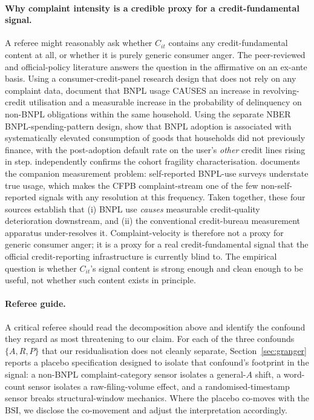 \documentclass[11pt,letterpaper]{article}
\newcommand{\bsi}{\text{BSI}}
\begin{document}
\paragraph{Why complaint intensity is a credible proxy for a
credit-fundamental signal.} A referee might reasonably ask
whether $C_{it}$ contains any credit-fundamental content at
all, or whether it is purely generic consumer anger. The
peer-reviewed and official-policy literature answers the
question in the affirmative on an ex-ante basis. Using a
consumer-credit-panel research design that does not rely on any
complaint data, \citet{fedphilly2023bnpl} document that BNPL
usage CAUSES an increase in revolving-credit utilisation and
a measurable increase in the probability of delinquency on
non-BNPL obligations within the same household. Using the
separate NBER BNPL-spending-pattern design,
\citet{dimaggio2022buy} show that BNPL adoption is associated
with systematically elevated consumption of goods that
households did not previously finance, with the post-adoption
default rate on the user's \emph{other} credit lines rising in
step. \citet{fedboston2024bnpl} independently confirms the
cohort fragility characterisation. \citet{dehaan2024accuracy}
documents the companion measurement problem: self-reported
BNPL-use surveys understate true usage, which makes the CFPB
complaint-stream one of the few non-self-reported signals with
any resolution at this frequency. Taken together, these four
sources establish that (i) BNPL use \emph{causes} measurable
credit-quality deterioration downstream, and (ii) the
conventional credit-bureau measurement apparatus under-resolves
it. Complaint-velocity is therefore not a proxy for generic
consumer anger; it is a proxy for a real credit-fundamental
signal that the official credit-reporting infrastructure is
currently blind to. The empirical question is whether
$C_{it}$'s signal content is strong enough and clean enough to
be useful, not whether such content exists in principle.

\paragraph{Referee guide.} A critical referee should read the
decomposition above and identify the confound they regard as
most threatening to our claim. For each of the three confounds
$\{A, R, P\}$ that our residualisation does not cleanly
separate, Section~\ref{sec:granger} reports a placebo specification
designed to isolate that confound's footprint in the signal:
a non-BNPL complaint-category sensor isolates a general-$A$
shift, a word-count sensor isolates a raw-filing-volume effect,
and a randomised-timestamp sensor breaks structural-window
mechanics. Where the placebo co-moves with the $\bsi$, we
disclose the co-movement and adjust the interpretation
accordingly.
\end{document}

